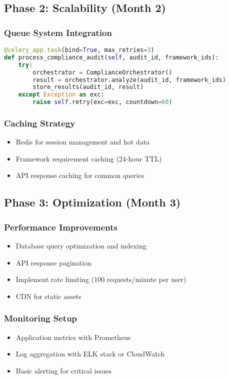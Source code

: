 \documentclass[12pt,a4paper]{report}
\begin{document}
\subsection{Phase 2: Scalability (Month 2)}

\subsubsection{Queue System Integration}
\begin{lstlisting}[language=Python, caption=Celery Task Example]
@celery_app.task(bind=True, max_retries=3)
def process_compliance_audit(self, audit_id, framework_ids):
    try:
        orchestrator = ComplianceOrchestrator()
        result = orchestrator.analyze(audit_id, framework_ids)
        store_results(audit_id, result)
    except Exception as exc:
        raise self.retry(exc=exc, countdown=60)
\end{lstlisting}

\subsubsection{Caching Strategy}
\begin{itemize}
    \item Redis for session management and hot data
    \item Framework requirement caching (24-hour TTL)
    \item API response caching for common queries
\end{itemize}

\subsection{Phase 3: Optimization (Month 3)}

\subsubsection{Performance Improvements}
\begin{itemize}
    \item Database query optimization and indexing
    \item API response pagination
    \item Implement rate limiting (100 requests/minute per user)
    \item CDN for static assets
\end{itemize}

\subsubsection{Monitoring Setup}
\begin{itemize}
    \item Application metrics with Prometheus
    \item Log aggregation with ELK stack or CloudWatch
    \item Basic alerting for critical issues
\end{itemize}
\end{document}

